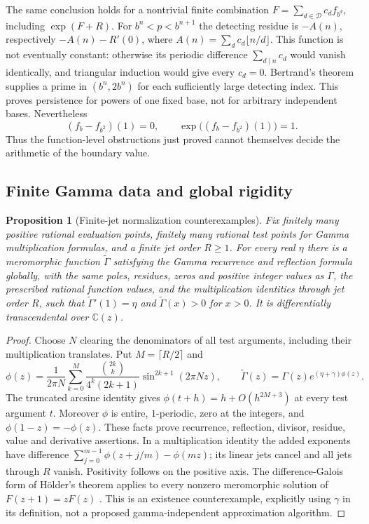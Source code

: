 \documentclass[11pt,a4paper]{article}
\newcommand{\C}{\mathbb C}
\newtheorem{proposition}[theorem]{Proposition}
\theoremstyle{definition}
\theoremstyle{remark}
\numberwithin{equation}{section}
\begin{document}
The same conclusion holds for a nontrivial finite combination
$F=\sum_{d\in\mathcal D}c_df_{b^d}$, including $\exp(F+R)$.
For $b^n<p<b^{n+1}$ the detecting residue is
$-A(n)$, respectively $-A(n)-R'(0)$, where
$A(n)=\sum_dc_d\lfloor n/d\rfloor$.  This function is not eventually
constant: otherwise its periodic difference
$\sum_{d\mid n}c_d$ would vanish identically, and triangular induction
would give every $c_d=0$.  Bertrand's theorem supplies a prime in
$(b^n,2b^n)$ for each sufficiently large detecting index.  This proves
persistence for powers of one fixed base, not for arbitrary independent
bases.  Nevertheless
\begin{equation}\label{ar:boundarycounter}
 (f_b-f_{b^2})(1)=0,
 \qquad \exp\bigl((f_b-f_{b^2})(1)\bigr)=1.
\end{equation}
Thus the function-level obstructions just proved cannot themselves decide
the arithmetic of the boundary value.

\subsection{Finite Gamma data and global rigidity}
\begin{proposition}[Finite-jet normalization counterexamples]
\label{ar:finitejet}
Fix finitely many positive rational evaluation points, finitely many
rational test points for Gamma multiplication formulas, and a finite jet
order $R\ge1$.  For every real $\eta$ there is a meromorphic function
$\widetilde\Gamma$ satisfying the Gamma recurrence and reflection formula
globally, with the same poles, residues, zeros and positive integer values
as $\Gamma$, the prescribed rational function values, and the multiplication
identities through jet order $R$, such that
$\widetilde\Gamma'(1)=\eta$ and $\widetilde\Gamma(x)>0$ for $x>0$.
It is differentially transcendental over $\C(z)$.
\end{proposition}
\begin{proof}
Choose $N$ clearing the denominators of all test arguments, including their
multiplication translates.  Put $M=\lceil R/2\rceil$ and
\[
 \phi(z)=\frac1{2\pi N}\sum_{k=0}^M
 \frac{\binom{2k}{k}}{4^k(2k+1)}\sin^{2k+1}(2\pi Nz),\qquad
 \widetilde\Gamma(z)=\Gamma(z)e^{(\eta+\gamma)\phi(z)}.
\]
The truncated arcsine identity gives
$\phi(t+h)=h+O(h^{2M+3})$ at every test argument $t$.
Moreover $\phi$ is entire, $1$-periodic, zero at the integers, and
$\phi(1-z)=-\phi(z)$.  These facts prove recurrence, reflection, divisor,
residue, value and derivative assertions.  In a multiplication identity
the added exponents have difference
$\sum_{j=0}^{m-1}\phi(z+j/m)-\phi(mz)$; its linear jets cancel and all
jets through $R$ vanish.  Positivity follows on the positive axis.
The difference-Galois form of H\"older's theorem applies to every nonzero
meromorphic solution of $F(z+1)=zF(z)$ \cite{ar:HardouinSinger}.
This is an existence counterexample, explicitly using $\gamma$ in its
definition, not a proposed gamma-independent approximation algorithm.
\end{proof}
\end{document}

